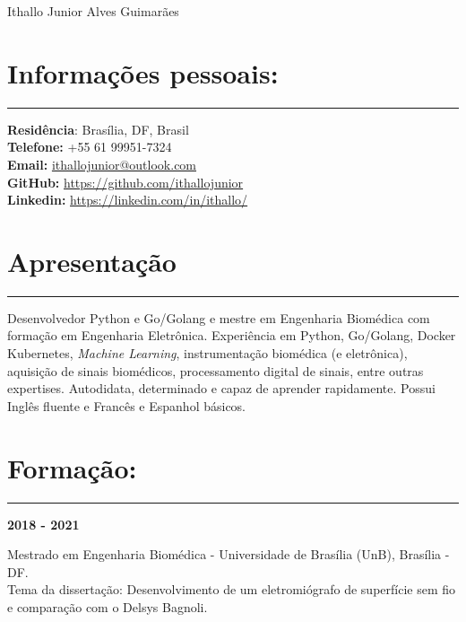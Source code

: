 \documentclass[11pt]{article}
\begin{document}
\begin{center}
\huge{Ithallo Junior Alves Guimarães}
\end{center}

\section{Informações pessoais:}
\hrule \vspace{0.1cm}
\begin{addmargin}{0.5cm}

\textbf{Residência}: Brasília, DF, Brasil \\
\textbf{Telefone:}  +55 61 99951-7324 \\
\textbf{Email:}   \href{maito:ithallojunior@outlook.com}{ithallojunior@outlook.com} \\
\textbf{GitHub:} \url{https://github.com/ithallojunior} \\
\textbf{Linkedin:} \url{https://linkedin.com/in/ithallo/}
\end{addmargin}

\section{Apresentação}
\hrule \vspace{0.1cm}

\begin{addmargin}{0.5cm}

Desenvolvedor Python e Go/Golang e mestre em Engenharia Biomédica com formação em Engenharia Eletrônica. 
Experiência em Python, Go/Golang, Docker Kubernetes, \textit{Machine Learning}, instrumentação biomédica (e 
eletrônica), aquisição de sinais biomédicos, processamento digital de sinais,
entre outras expertises. Autodidata, determinado e 
capaz de aprender rapidamente. Possui Inglês fluente e Francês e Espanhol básicos.

\end{addmargin}

\section{Formação:}
\hrule \vspace{0.1cm}

\textbf{2018 - 2021}
\begin{addmargin}{0.5cm}
Mestrado em Engenharia Biomédica - Universidade de Brasília (UnB), Brasília - DF.\\ 
Tema da dissertação: Desenvolvimento de um eletromiógrafo de superfície sem fio e
comparação com o Delsys Bagnoli.\\
\end{addmargin}
\end{document}
